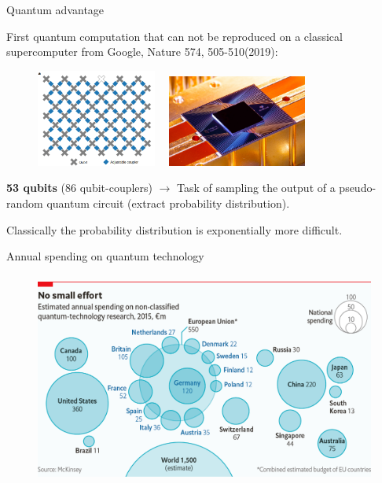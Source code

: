 \documentclass[aspectratio=169, 10pt, xcolor={svgnames}, hyperref={linkcolor=black}]{beamer}
\begin{document}
\begin{frame}{Quantum advantage}

   First quantum computation that can not be reproduced on a classical
   supercomputer from Google, {\color{magenta}Nature 574, 505-510(2019)}:

   \begin{figure}
     \includegraphics[height=3.2cm]{figures/q3.png}%
     $\quad$\includegraphics[height=3cm]{figures/q2.png}
   \end{figure}

   \textbf{53 qubits} (86 qubit-couplers) $\rightarrow$ Task of sampling the
   output of a pseudo-random quantum circuit (extract probability
   distribution).

   Classically the probability distribution is {\color{blue}exponentially more difficult}.

 \end{frame}

 \begin{frame}[fragile]{Annual spending on quantum technology}

     \begin{figure}
         \includegraphics[height=7cm]{figures/20170311_01_DESKTOP.png}
     \end{figure}

 \end{frame}
\end{document}

